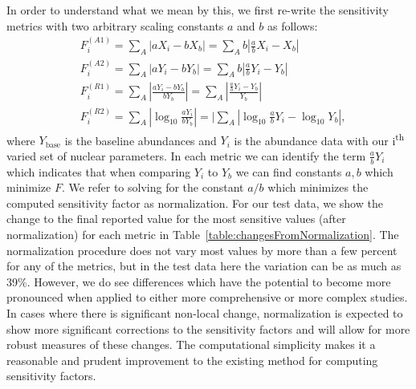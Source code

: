 \documentclass[aps,prc,reprint,showpacs,floatfix,nofootinbib]{revtex4-1}
\begin{document}
In order to understand what we mean by this, we first re-write the sensitivity metrics  
with two arbitrary scaling constants $a$ and $b$ as follows:
\begin{align}
\label{eq:F1a}
	&F_i^{(A1)} =  \sum_A \left| a X_i - b X_b \right| = \sum_A b \left| \frac{a}{b}X_i - X_b \right| \\
\label{eq:F1b}
	&F_i^{(A2)} = \sum_A \left| a Y_i - b Y_b \right| = \sum_A b \left| \frac{a}{b}Y_i - Y_b \right| \\
\label{eq:F2}
	&F_i^{(R1)} = \sum_A \left|\frac{ a Y_i - b Y_b}{b Y_b} \right| = \sum_A \left|\frac{\frac{a}{b}Y_i - Y_b}{Y_b} \right| \\
\label{eq:F3}
	&F_i^{(R2)} = \sum_A \left| \log_{10}\frac{a Y_i}{b Y_b} \right| =  |\sum_A \left| \log_{10} \frac{a}{b} Y_i - \log_{10} Y_b \right|,
\end{align}
where $Y_\textrm{base}$ is the baseline abundances and $Y_i$ is the abundance data with 
our i\textsuperscript{th} varied set of nuclear parameters.
In each metric we can identify the term $\frac{a}{b} Y_i$ which indicates that when comparing $Y_i$ to $Y_b$  we can 
find constants $a, b$ which minimize $F$. We refer to solving for the constant $a/b$ which minimizes the 
computed sensitivity factor as normalization. For our 
test data, we show the change to the final reported value for the most sensitive values (after normalization) for each metric in Table~\ref{table:changesFromNormalization}. 
The normalization procedure does not vary most values by more than a few percent for any of the metrics, but in 
the test data here the variation can be as much as 39\%. However, we do see differences which have the potential to become more pronounced 
when applied to either more comprehensive or more complex studies. In cases where there is significant non-local change, normalization 
is expected to show more significant corrections to the sensitivity factors and will allow for more robust measures of these changes.
The computational simplicity makes it 
a reasonable and prudent improvement to the existing method for computing sensitivity factors. 
\end{document}
